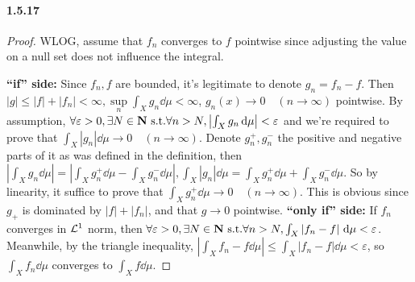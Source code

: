 \documentclass{article}
\begin{document}
\paragraph{1.5.17}
\begin{proof}
WLOG, assume that $f_n$ converges to $f$ pointwise since adjusting the value on a null set does not influence the integral.

\textbf{``if'' side:} Since $f_n,f$ are bounded, it's legitimate to denote $g_n=f_n-f$. Then $|g|\leq |f|+|f_n|<\infty,\sup\limits_{n}\int_{X}g_n\dd\mu<\infty$, $g_n(x)\to 0\quad(n\to\infty)$ pointwise. By assumption, $\forall \varepsilon>0,\exists N\in\mathbf{N}\text{ s.t.} \forall n>N, \left|\int_{X}g_n\,\mathrm{d}\mu\right|<\varepsilon$ and we're required to prove that $\int_{X}|g_n|\dd\mu\to 0\quad(n\to\infty)$. Denote $g_n^+, g_n^-$ the positive and negative parts of it as was defined in the definition, then $\left|\int_{X}g_n\dd\mu\right|=\left|\int_{X}g_n^+\dd\mu-\int_{X}g_n^-\dd\mu\right|,\int_{X}\left|g_n\right|\dd\mu=\int_{X}g_n^+\dd\mu+\int_{X}g_n^-\dd\mu$. So by linearity, it suffice to prove that $\int_{X}g_n^+\dd\mu\to 0\quad(n\to\infty)$. This is obvious since $g_+$ is dominated by $|f|+|f_n|$, and that $g\to 0$ pointwise.
\textbf{``only if'' side:} If $f_n$ converges in $\mathcal{L}^1$ norm, then $\forall\varepsilon>0,\exists N\in\mathbf{N}\text{ s.t.} \forall n>N, \int_{X}\left|f_n-f\right|\,\mathrm{d}\mu<\varepsilon$. Meanwhile, by the triangle inequality, $\left|\int_{X}f_n-f\dd\mu\right|\leq \int_{X}\left|f_n-f\right|\dd\mu<\varepsilon$, so $\int_{X}f_n\dd\mu$ converges to $\int_{X}f\dd\mu$.
\end{proof}
\end{document}
